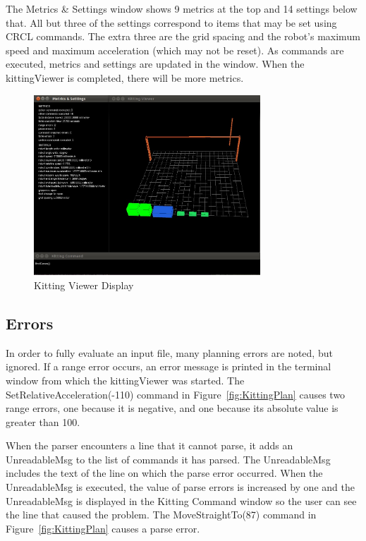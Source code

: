The Metrics \& Settings window shows 9 metrics at the top and 14 settings
below that. All but three of the settings correspond to items that may be
set using CRCL commands. The extra three are the grid spacing and the robot\rq{}s
maximum speed and maximum acceleration (which may not be reset). As
commands are executed, metrics and settings are updated in the window.
When the kittingViewer is completed, there will be more metrics.
\begin{figure}[ht!]
\begin{center}
\includegraphics[width=8.5cm]{images/kittingViewer.jpg}
\caption{Kitting Viewer Display}
\label{fig:KittingViewer}
\end{center}
\end{figure}

\subsection{Errors}
In order to fully evaluate an input file, many planning errors are noted, but
ignored.
 If a range error
  occurs, an error message is printed in the terminal window from which the
  kittingViewer was started. The \sf SetRelativeAcceleration(-110) \rm
  command in Figure~\ref{fig:KittingPlan} causes two range errors, one
  because it is negative, and one because its absolute value is greater
  than 100.
  
  When the parser
  encounters a line that it cannot parse, it adds an \sf UnreadableMsg \rm to the
  list of commands it has parsed. The \sf UnreadableMsg \rm includes the text of
  the line on which the parse error occurred. When the \sf UnreadableMsg \rm is
  executed, the value of parse errors is increased by one and the
 \sf  UnreadableMsg \rm is displayed in the Kitting Command window so the user can
  see the line that caused the problem. The \sf MoveStraightTo(87) \rm
  command in Figure~\ref{fig:KittingPlan} causes a parse error.\\
  
